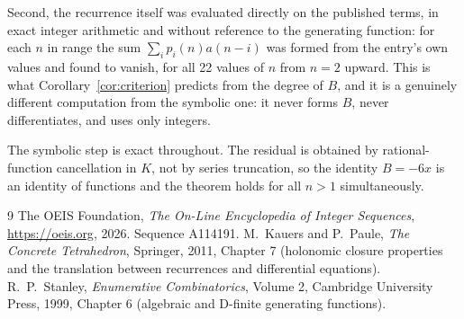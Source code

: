 \documentclass[11pt,a4paper]{article}
\theoremstyle{plain}
\theoremstyle{definition}
\begin{document}
Second, the recurrence itself was evaluated directly on the published terms, in exact
integer arithmetic and without reference to the generating function: for each $n$ in range
the sum $\sum_{i}p_{i}(n)a(n-i)$ was formed from the entry's own values and found to
vanish, for all 22 values of $n$ from $n=2$ upward. This is what
Corollary~\ref{cor:criterion} predicts from the degree of $B$, and it is a genuinely
different computation from the symbolic one: it never forms $B$, never differentiates, and
uses only integers.

The symbolic step is exact throughout. The residual is obtained by rational-function
cancellation in $K$, not by series truncation, so the identity $B=- 6 x$ is an
identity of functions and the theorem holds for all $n>1$ simultaneously.

\begin{thebibliography}{9}
 The OEIS Foundation, \emph{The On-Line Encyclopedia of Integer Sequences},
\url{https://oeis.org}, 2026. Sequence A114191.
 M.~Kauers and P.~Paule, \emph{The Concrete Tetrahedron}, Springer, 2011,
Chapter 7 (holonomic closure properties and the translation between recurrences and
differential equations).
 R.~P.~Stanley, \emph{Enumerative Combinatorics}, Volume 2, Cambridge
University Press, 1999, Chapter 6 (algebraic and D-finite generating functions).
\end{thebibliography}
\end{document}
